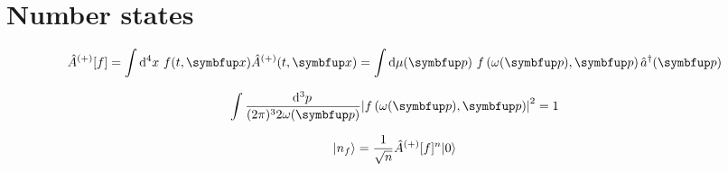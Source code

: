 \section{Number states}

\begin{equation}
	\begin{split}
		\hat{A}^{(+)}[f]
		=
		\int\dd[4]{x}
		f(t,\vb{x})
		\hat{A}^{(+)}(t,\vb{x})
		=
		\int\dd{\mu(\vb{p})}
		f\left(\omega(\vb{p}),\vb{p}\right)
		\hat{a}^\dagger(\vb{p})
	\end{split}
\end{equation}

\begin{equation}
	\int\frac{\dd[3]{p}}{(2\pi)^32\omega(\vb{p})}
	\abs*{f\left(\omega(\vb{p}),\vb{p}\right)}^2
	=
	1
\end{equation}

\begin{equation}
	\lvert n_f\rangle
	=
	\frac{1}{\sqrt{n}}
	\hat{A}^{(+)}[f]^n
	\lvert0\rangle
\end{equation}